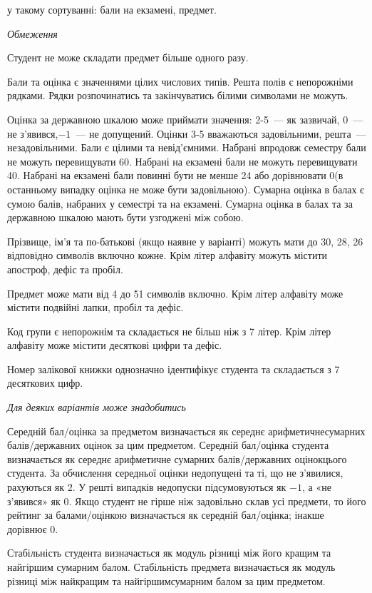 \documentclass[11pt, ukrainian]{article}
\begin{document}
{\noindent}у такому сортуванні: бали на екзамені, предмет.


\bigskip\textit{Обмеження}

Студент не може складати предмет більше одного разу.

Бали та оцінка є значеннями цілих числових типів. Решта полів є непорожніми рядками.
Рядки розпочинатись та закінчуватись білими символами не можуть.

Оцінка за державною шкалою може приймати значення: 2-5~--- як зазвичай, 0~--- не з’явився,$-1$~--- не допущений. 
Оцінки 3-5 вважаються задовільними, решта~--- незадовільними. 
Бали є цілими та невід’ємними.
Набрані впродовж семестру бали не можуть перевищувати 60. 
Набрані на екзамені бали не можуть перевищувати 40. 
Набрані на екзамені бали повинні бути не менше 24 або дорівнювати 0(в останньому випадку оцінка не може бути задовільною). 
Сумарна оцінка в балах є сумою балів, набраних у семестрі та на екзамені.
Сумарна оцінка в балах та за державною шкалою мають бути узгоджені між собою.

Прізвище, ім’я та по-батькові (якщо наявне у варіанті) можуть мати до 30, 28, 26 відповідно символів включно кожне. 
Крім літер алфавіту можуть містити апостроф, дефіс та пробіл.

Предмет може мати від 4 до 51 символів включно. 
Крім літер алфавіту може містити подвійні лапки, пробіл та дефіс.

Код групи є непорожнім та складається не більш ніж з 7 літер. 
Крім літер алфавіту може містити десяткові цифри та дефіс.


Номер залікової книжки однозначно ідентифікує студента та складається з 7 десяткових цифр. 

\bigskip\textit{Для деяких варіантів може знадобитись}

Середній бал/оцінка за предметом визначається як середнє арифметичнесумарних балів/державних оцінок за цим предметом. 
Середній бал/оцінка студента визначається як середнє арифметичне сумарних балів/державних оцінокцього студента. 
За обчислення середньої оцінки недопущені та ті, що не з’явилися, рахуються як 2.
У решті випадків недопуски підсумовуються як $-1$, а «не з’явився» як 0.
Якщо студент не гірше ніж задовільно склав усі предмети, 
то його рейтинг за балами/оцінкою визначається як середній бал/оцінка; інакше дорівнює 0.

Стабільність студента визначається як модуль різниці між його кращим та найгіршим сумарним балом.
Стабільність предмета визначається як модуль різниці між найкращим та найгіршимсумарним балом за цим предметом.
\end{document}
